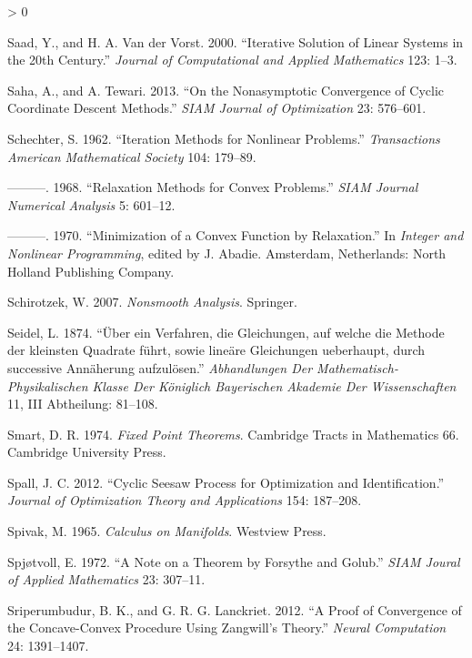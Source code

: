 \documentclass[
  12pt,
]{book}
\newlength{\cslhangindent}
\newenvironment{CSLReferences}[2] %
 {%
  \setlength{\parindent}{0pt}
  \ifodd #1 \everypar{\setlength{\hangindent}{\cslhangindent}}\ignorespaces\fi
  \ifnum #2 > 0
  \setlength{\parskip}{#2\baselineskip}
  \fi
 }%
 {}
\begin{document}
\begin{CSLReferences}{1}{0}
\leavevmode\hypertarget{ref-saad_vandervorst_00}{}%
Saad, Y., and H. A. Van der Vorst. 2000. {``Iterative Solution of Linear Systems in the 20th Century.''} \emph{Journal of Computational and Applied Mathematics} 123: 1--3.

\leavevmode\hypertarget{ref-saha_tewari_13}{}%
Saha, A., and A. Tewari. 2013. {``{On the Nonasymptotic Convergence of Cyclic Coordinate Descent Methods}.''} \emph{SIAM Journal of Optimization} 23: 576--601.

\leavevmode\hypertarget{ref-schechter_62}{}%
Schechter, S. 1962. {``{Iteration Methods for Nonlinear Problems}.''} \emph{Transactions American Mathematical Society} 104: 179--89.

\leavevmode\hypertarget{ref-schechter_68}{}%
---------. 1968. {``{Relaxation Methods for Convex Problems}.''} \emph{{SIAM} Journal Numerical Analysis} 5: 601--12.

\leavevmode\hypertarget{ref-schechter_70}{}%
---------. 1970. {``{Minimization of a Convex Function by Relaxation}.''} In \emph{Integer and Nonlinear Programming}, edited by J. Abadie. Amsterdam, Netherlands: North Holland Publishing Company.

\leavevmode\hypertarget{ref-schirotzek_07}{}%
Schirotzek, W. 2007. \emph{Nonsmooth Analysis}. Springer.

\leavevmode\hypertarget{ref-seidel_74}{}%
Seidel, L. 1874. {``{{Ü}ber ein Verfahren, die Gleichungen, auf welche die Methode der kleinsten Quadrate f{ü}hrt, sowie line{ä}re Gleichungen ueberhaupt, durch successive Ann{ä}herung aufzul{ö}sen}.''} \emph{Abhandlungen Der Mathematisch-Physikalischen Klasse Der K{ö}niglich Bayerischen Akademie Der Wissenschaften} 11, III Abtheilung: 81--108.

\leavevmode\hypertarget{ref-smart_74}{}%
Smart, D. R. 1974. \emph{Fixed Point Theorems}. Cambridge Tracts in Mathematics 66. Cambridge University Press.

\leavevmode\hypertarget{ref-spall_12}{}%
Spall, J. C. 2012. {``{Cyclic Seesaw Process for Optimization and Identification}.''} \emph{Journal of Optimization Theory and Applications} 154: 187--208.

\leavevmode\hypertarget{ref-spivak_65}{}%
Spivak, M. 1965. \emph{Calculus on Manifolds}. Westview Press.

\leavevmode\hypertarget{ref-spjotvoll_72}{}%
Spjøtvoll, E. 1972. {``A Note on a Theorem by Forsythe and Golub.''} \emph{SIAM Joural of Applied Mathematics} 23: 307--11.

\leavevmode\hypertarget{ref-sriperumbudur_lanckriet_12}{}%
Sriperumbudur, B. K., and G. R. G. Lanckriet. 2012. {``{A Proof of Convergence of the Concave-Convex Procedure Using Zangwill's Theory}.''} \emph{Neural Computation} 24: 1391--1407.


\end{CSLReferences}
\end{document}
